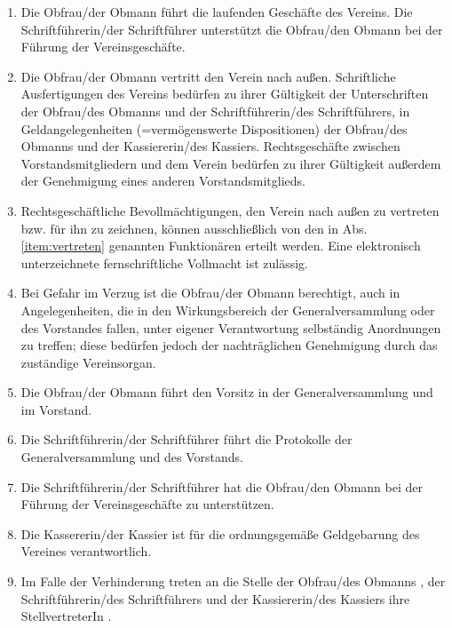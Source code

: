 \documentclass[a4paper,12pt]{article}
\newcommand{\comment}[1]{{\bf /*Komm.:} \textit{#1} {\bf */}}
\def\comment#1{}
\newcommand{\stv}{StellvertreterIn }
\newcommand{\Derobmann}{Die Obfrau/der Obmann }
\newcommand{\Derkassier}{Die Kassererin/der Kassier }
\newcommand{\derobmann}{die Obfrau/der Obmann }
\newcommand{\denobmann}{die Obfrau/den Obmann }
\newcommand{\desobmanns}{der Obfrau/des Obmanns }
\newcommand{\Dersecretary}{Die Schriftf\"uhrerin/der Schriftf\"uhrer }
\newcommand{\dessecretary}{der Schriftf\"uhrerin/des Schriftf\"uhrers }
\newcommand{\dessecretaryk}{der Schriftf\"uhrerin/des Schriftf\"uhrers}
\newcommand{\deskassiers}{der Kassiererin/des Kassiers }
\newcommand{\deskassiersk}{der Kassiererin/des Kassiers}
\begin{document}
\begin{enumerate}
\item \Derobmann führt die laufenden Geschäfte des Vereins. \Dersecretary unterstützt \denobmann bei der Führung der Vereinsgeschäfte.
\item \label{item:vertreten} \Derobmann vertritt den Verein nach außen.
Schriftliche Ausfertigungen des Vereins bedürfen zu ihrer Gültigkeit der Unterschriften \desobmanns und \dessecretaryk, in Geldangelegenheiten (=vermögenswerte Dispositionen) \desobmanns und \deskassiersk.
Rechtsgeschäfte zwischen Vorstandsmitgliedern und dem Verein bedürfen zu ihrer Gültigkeit außerdem der Genehmigung eines anderen Vorstandsmitglieds. \comment{wieder BMI orig., statt 'der Genehmg. d. GV'}

\item Rechtsgeschäftliche Bevollmächtigungen, den Verein nach außen zu vertreten bzw. für ihn zu zeichnen, können ausschließlich von den in Abs. \ref{item:vertreten} genannten Funktionären erteilt werden. Eine elektronisch unterzeichnete fernschriftliche Vollmacht ist zulässig.
\comment{Linuxtage haben hier zusätzlich : "Eine elektronisch unterzeichnete fernschriftliche Vollmacht ist zulässig." }

\item Bei Gefahr im Verzug ist \derobmann berechtigt, auch in Angelegenheiten, die in den Wirkungsbereich der Generalversammlung oder des Vorstandes fallen, unter eigener Verantwortung selbständig Anordnungen zu treffen; diese bedürfen jedoch der nachträglichen Genehmigung durch das zuständige Vereinsorgan.

\item \Derobmann führt den Vorsitz in der Generalversammlung und im Vorstand.

\item \Dersecretary führt die Protokolle der Generalversammlung und des Vorstands.
\item \Dersecretary hat \denobmann bei der Führung der Vereinsgeschäfte zu unterstützen.
\comment{zweiter Punkt hier ("..unterstützen") ist zusätzlich zum Orig. BMI Text, steht aber sowieso schon oben in Pkt 1 §13}

\item \Derkassier ist für die ordnungsgemäße Geldgebarung des Vereines verantwortlich.

\item Im Falle der Verhinderung treten an die Stelle \desobmanns, \dessecretary und \deskassiers ihre \stv.

\end{enumerate}
\end{document}

